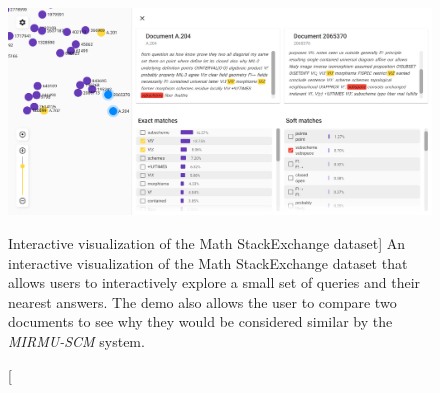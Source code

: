 \begin{figure}
\includegraphics{document-maps}
\caption
  [Interactive visualization of the Math StackExchange dataset]%
  {An interactive visualization of the Math StackExchange dataset
   that allows users to interactively explore a small set of queries
   and their nearest answers. The demo also allows the user to
   compare two documents to see why they would be considered similar
   by the \emph{MIRMU-SCM} system. \cite[Figure 3]{novotny2021ensembling}}
\label{fig:document-maps}
\end{figure}
